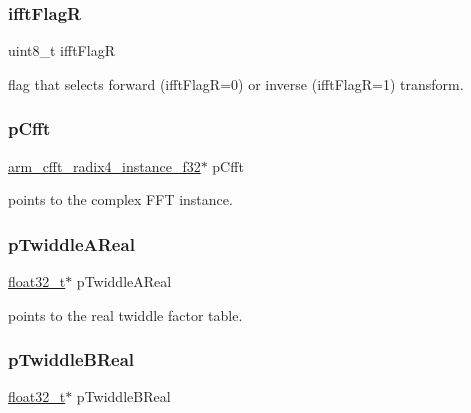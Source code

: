 \subsubsection{\texorpdfstring{ifftFlagR}{ifftFlagR}}
{\footnotesize\ttfamily uint8\+\_\+t ifft\+FlagR}

flag that selects forward (ifft\+FlagR=0) or inverse (ifft\+FlagR=1) transform. \mbox{\label{structarm__rfft__instance__f32_ab7bd4d374a1780dea50efd3e7ac220be}} 
\subsubsection{\texorpdfstring{pCfft}{pCfft}}
{\footnotesize\ttfamily \mbox{\hyperlink{structarm__cfft__radix4__instance__f32}{arm\+\_\+cfft\+\_\+radix4\+\_\+instance\+\_\+f32}}$\ast$ p\+Cfft}

points to the complex F\+FT instance. \mbox{\label{structarm__rfft__instance__f32_a1fb731395d060f9999c91c242b3e8a61}} 
\subsubsection{\texorpdfstring{pTwiddleAReal}{pTwiddleAReal}}
{\footnotesize\ttfamily \mbox{\hyperlink{arm__math_8h_a4611b605e45ab401f02cab15c5e38715}{float32\+\_\+t}}$\ast$ p\+Twiddle\+A\+Real}

points to the real twiddle factor table. \mbox{\label{structarm__rfft__instance__f32_ab13a458744ac79bb23784351e8002382}} 
\subsubsection{\texorpdfstring{pTwiddleBReal}{pTwiddleBReal}}
{\footnotesize\ttfamily \mbox{\hyperlink{arm__math_8h_a4611b605e45ab401f02cab15c5e38715}{float32\+\_\+t}}$\ast$ p\+Twiddle\+B\+Real}

